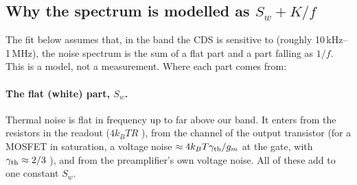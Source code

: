 \documentclass[10pt,a4paper]{article}
\begin{document}
\subsection{Why the spectrum is modelled as $S_w+K/f$}\label{sec:form}
The fit below assumes that, in the band the CDS is sensitive to (roughly 10\,kHz--1\,MHz), the noise spectrum is the
sum of a flat part and a part falling as $1/f$. This is a model, not a measurement. Where each part comes from:

\paragraph{The flat (white) part, $S_w$.} Thermal noise is flat in frequency up to far above our band. It enters from
the resistors in the readout ($4k_BTR$ \cite{johnson1928,nyquist1928}), from the channel of the output transistor
(for a MOSFET in saturation, a voltage noise $\approx4k_BT\gamma_{\rm th}/g_m$ at the gate, with $\gamma_{\rm th}\approx2/3$
\cite{gray2009}), and from the preamplifier's own voltage noise. All of these add to one constant $S_w$.
\end{document}
